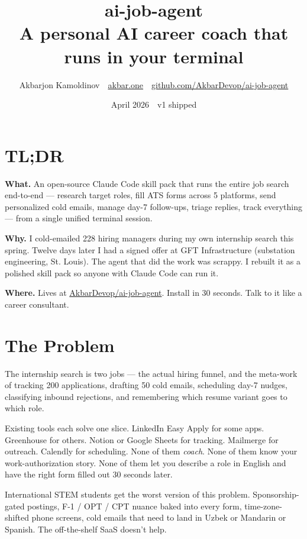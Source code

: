 \documentclass[11pt]{article}
\title{\vspace{-2em}\textbf{ai-job-agent}\\[0.2em]\large\color{muted}A personal AI career coach that runs in your terminal}
\author{Akbarjon Kamoldinov \,\textbar\, \href{https://akbar.one}{akbar.one} \,\textbar\, \href{https://github.com/AkbarDevop/ai-job-agent}{github.com/AkbarDevop/ai-job-agent}}
\date{April 2026 \,\textbar\, v1 shipped}
\begin{document}
\maketitle
\thispagestyle{empty}

\vspace{-1em}
\section*{TL;DR}

\noindent\textbf{What.} An open-source Claude Code skill pack that runs the entire job search end-to-end --- research target roles, fill ATS forms across 5 platforms, send personalized cold emails, manage day-7 follow-ups, triage replies, track everything --- from a single unified terminal session.

\noindent\textbf{Why.} I cold-emailed 228 hiring managers during my own internship search this spring. Twelve days later I had a signed offer at GFT Infrastructure (substation engineering, St. Louis). The agent that did the work was scrappy. I rebuilt it as a polished skill pack so anyone with Claude Code can run it.

\noindent\textbf{Where.} Lives at \href{https://github.com/AkbarDevop/ai-job-agent}{AkbarDevop/ai-job-agent}. Install in 30 seconds. Talk to it like a career consultant.

\section{The Problem}

The internship search is two jobs --- the actual hiring funnel, and the meta-work of tracking 200 applications, drafting 50 cold emails, scheduling day-7 nudges, classifying inbound rejections, and remembering which resume variant goes to which role.

Existing tools each solve one slice. LinkedIn Easy Apply for some apps. Greenhouse for others. Notion or Google Sheets for tracking. Mailmerge for outreach. Calendly for scheduling. None of them \emph{coach}. None of them know your work-authorization story. None of them let you describe a role in English and have the right form filled out 30 seconds later.

International STEM students get the worst version of this problem. Sponsorship-gated postings, F-1 / OPT / CPT nuance baked into every form, time-zone-shifted phone screens, cold emails that need to land in Uzbek or Mandarin or Spanish. The off-the-shelf SaaS doesn't help.
\end{document}
